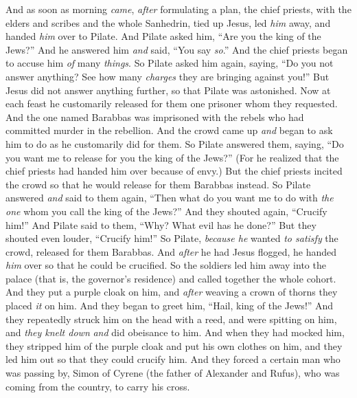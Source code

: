 \begin{biblechapter} %
 And as soon as morning \textit{came}, \textit{after} formulating a plan, the chief priests, with the elders and scribes and the whole Sanhedrin, tied up Jesus, led \textit{him} away, and handed \textit{him} over to Pilate.
\verse And Pilate asked him, “Are you the king of the Jews?” And he answered him \textit{and} said, “You say \textit{so}.”
\verse And the chief priests began to accuse him \textit{of} many \textit{things}.
\verse So Pilate asked him again, saying, “Do you not answer anything? See how many \textit{charges} they are bringing against you!”
\verse But Jesus did not answer anything further, so that Pilate was astonished.
 Now at each feast he customarily released for them one prisoner whom they requested.
\verse And the one named Barabbas was imprisoned with the rebels who had committed murder in the rebellion.
\verse And the crowd came up \textit{and} began to ask him to do as he customarily did for them.
\verse So Pilate answered them, saying, “Do you want me to release for you the king of the Jews?”
\verse (For he realized that the chief priests had handed him over because of envy.)
\verse But the chief priests incited the crowd so that he would release for them Barabbas instead.
\verse So Pilate answered \textit{and} said to them again, “Then what do you want me to do with \textit{the one} whom you call the king of the Jews?”
\verse And they shouted again, “Crucify him!”
\verse And Pilate said to them, “Why? What evil has he done?” But they shouted even louder, “Crucify him!”
\verse So Pilate, \textit{because he} wanted \textit{to satisfy} the crowd, released for them Barabbas. And \textit{after} he had Jesus flogged, he handed \textit{him} over so that he could be crucified.
 So the soldiers led him away into the palace (that is, the governor’s residence) and called together the whole cohort.
\verse And they put a purple cloak on him, and \textit{after} weaving a crown of thorns they placed \textit{it} on him.
\verse And they began to greet him, “Hail, king of the Jews!”
\verse And they repeatedly struck him on the head with a reed, and were spitting on him, and \textit{they knelt down} \textit{and} did obeisance to him.
\verse And when they had mocked him, they stripped him of the purple cloak and put his own clothes on him, and they led him out so that they could crucify him.
 And they forced a certain man who was passing by, Simon of Cyrene (the father of Alexander and Rufus), who was coming from the country, to carry his cross.

\end{biblechapter}
